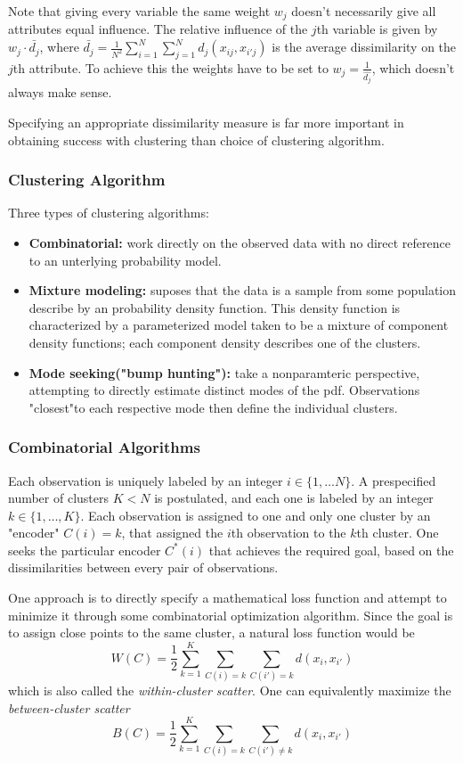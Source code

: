 \documentclass{scrartcl}
\begin{document}
Note that giving every variable the same weight \(w_j\) doesn't necessarily give all attributes equal influence. The relative influence of the \(j\)th variable is given by \(w_j \cdot \bar{d_j}\), where \(\bar{d_j} = \frac{1}{N^2} \sum_{i=1}^{N}\sum_{j=1}^{N}d_j(x_{ij}, x_{i'j})\) is the average dissimilarity on the \(j\)th attribute. To achieve this the weights have to be set to \(w_j = \frac{1}{\hat{d_j}}\), which doesn't always make sense.

Specifying an appropriate dissimilarity measure is far more important in obtaining success with clustering than choice of clustering algorithm.

\subsubsection{Clustering Algorithm}
Three types of clustering algorithms:
\begin{itemize}
    \item
        \textbf{Combinatorial:} work directly on the observed data with no direct reference to an unterlying probability model.
    \item
        \textbf{Mixture modeling:} suposes that the data is a sample from some population describe by an probability density function. This density function is characterized by a parameterized model taken to be a mixture of component density functions; each component density describes one of the clusters.
    \item
        \textbf{Mode seeking("bump hunting"):} take a nonparamteric perspective, attempting to directly estimate distinct modes of the pdf. Observations "closest"to each respective mode then define the individual clusters.
\end{itemize}
\subsubsection{Combinatorial Algorithms}
Each observation is uniquely labeled by an integer \(i \in \{1, \dots N\}\). A prespecified number of clusters \(K<N\) is postulated, and each one is labeled by an integer \(k \in \{1, \dots, K\}\). Each observation is assigned to one and only one cluster by an "encoder" \(C(i) = k\), that assigned the \(i\)th observation to the \(k\)th cluster. One seeks the particular encoder \(C^*(i)\) that achieves the required goal, based on the dissimilarities between every pair of observations.

One approach is to directly specify a mathematical loss function and attempt to minimize it through some combinatorial optimization algorithm. Since the goal is to assign close points to the same cluster, a natural loss function would be 
\[W(C) = \frac{1}{2} \sum_{k=1}^K \sum_{C(i)=k}\sum_{C(i')=k} d(x_i, x_{i'})\]
which is also called the \textit{within-cluster scatter}. One can equivalently maximize the \textit{between-cluster scatter}
\[B(C) = \frac{1}{2} \sum_{k=1}^K \sum_{C(i)=k}\sum_{C(i') \neq k} d(x_i, x_{i'})\]
\end{document}
